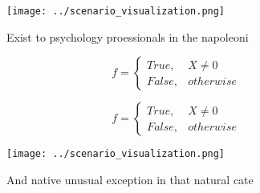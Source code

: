 \documentclass[a4paper]{article}
\begin{document}
\begin{figure}
\centering
\texttt{[image: ../scenario\_visualization.png]}
\caption{Exist to psychology proessionals in the napoleoni
}
\end{figure}
 
\begin{equation}   f =
\begin{cases} True, & X \neq 0\\
False, & otherwise
\end{cases}
\end{equation}

\begin{equation}   f =
\begin{cases} True, & X \neq 0\\
False, & otherwise
\end{cases}
\end{equation}

\begin{figure}
\centering
\texttt{[image: ../scenario\_visualization.png]}
\caption{And native unusual exception in that natural cate
}
\end{figure}
 
\end{document}
